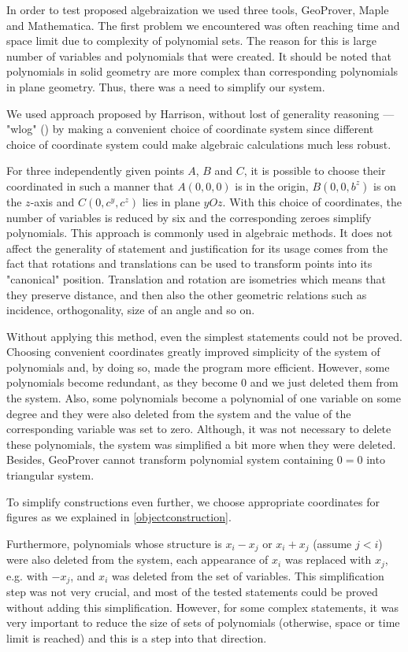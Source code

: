 \documentclass[final,1p,times,authoryear]{elsarticle}
\begin{document}
In order to test proposed algebraization we used three tools,
GeoProver, Maple and Mathematica. The first problem we encountered was
often reaching time and space limit due to complexity of polynomial
sets. The reason for this is large number of variables and polynomials
that were created. It should be noted that polynomials in solid
geometry are more complex than corresponding polynomials in plane
geometry. Thus, there was a need to simplify our system.

We used approach proposed by Harrison, without lost of generality
reasoning --- "wlog" (\cite{harrison}) by making a convenient choice
of coordinate system since different choice of coordinate system could
make algebraic calculations much less robust.

For three independently given points $A$, $B$ and $C$, it is possible
to choose their coordinated in such a manner that $A(0, 0, 0)$ is in
the origin, $B(0, 0, b^z)$ is on the $z$-axis and $C(0, c^y, c^z)$
lies in plane $yOz$. With this choice of coordinates, the number of
variables is reduced by six and the corresponding zeroes simplify
polynomials. This approach is commonly used in algebraic methods. It
does not affect the generality of statement and justification for its
usage comes from the fact that rotations and translations can be used
to transform points into its "canonical" position. Translation and
rotation are isometries which means that they preserve distance, and
then also the other geometric relations such as incidence,
orthogonality, size of an angle and so on.

Without applying this method, even the simplest statements could not
be proved. Choosing convenient coordinates greatly improved simplicity
of the system of polynomials and, by doing so, made the program more
efficient. However, some polynomials become redundant, as they become
$0$ and we just deleted them from the system. Also, some polynomials
become a polynomial of one variable on some degree and they were also
deleted from the system and the value of the corresponding variable
was set to zero. Although, it was not necessary to delete these
polynomials, the system was simplified a bit more when they were
deleted. Besides, GeoProver cannot transform polynomial system
containing $0 = 0$ into triangular system.

To simplify constructions even further, we choose appropriate
coordinates for figures as we explained in \ref{objectconstruction}.

Furthermore, polynomials whose structure is $x_i - x_j$ or $x_i + x_j$
(assume $j < i$) were also deleted from the system, each appearance of
$x_i$ was replaced with $x_j$, e.g. with $-x_j$, and $x_i$ was deleted
from the set of variables. This simplification step was not very
crucial, and most of the tested statements could be proved without
adding this simplification. However, for some complex statements, it
was very important to reduce the size of sets of polynomials
(otherwise, space or time limit is reached) and this is a step into
that direction.
\end{document}
